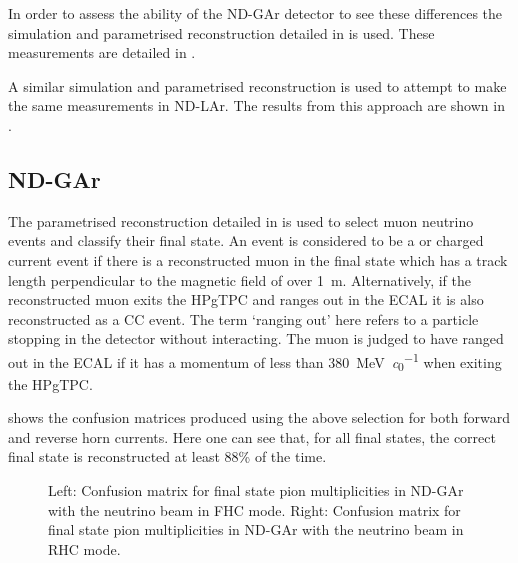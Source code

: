 In order to assess the ability of the ND-GAr detector to see these differences the simulation and parametrised reconstruction detailed in  is used.
These measurements are detailed in .

A similar simulation and parametrised reconstruction is used to attempt to make the same measurements in ND-LAr. 
The results from this approach are shown in .

\subsection{ND-GAr}
\label{sec:dune_ndrwt:pionMulti:gar}

The parametrised reconstruction detailed in  is used to select muon neutrino events and classify their final state.
An event is considered to be a \numu or \anumu charged current event if there is a reconstructed muon in the final state which has a track length perpendicular to the magnetic field of over \SI{1}{\metre}.
Alternatively, if the reconstructed muon exits the HPgTPC and ranges out in the ECAL it is also reconstructed as a \numu CC event.
The term `ranging out' here refers to a particle stopping in the detector without interacting.
The muon is judged to have ranged out in the ECAL if it has a momentum of less than \SI{380}{\MeV\per\clight} when exiting the HPgTPC. 

 shows the confusion matrices produced using the above selection for both forward and reverse horn currents. 
Here one can see that, for all final states, the correct final state is reconstructed at least 88\% of the time.

\begin{figure}[h]
	\begin{minipage}[t]{.5\linewidth}
		\begin{adjustbox}{max totalsize=\linewidth, center}
			
		\end{adjustbox}
	\end{minipage}
	\hfill
	\begin{minipage}[t]{.5\linewidth}
		\begin{adjustbox}{max totalsize=\linewidth, center}
			
		\end{adjustbox}
	\end{minipage}
	\caption[Confusion matrices for final state pion multiplicities in ND-GAr]{Left: Confusion matrix for final state pion multiplicities in ND-GAr with the neutrino beam in FHC mode. Right: Confusion matrix for final state pion multiplicities in ND-GAr with the neutrino beam in RHC mode.}
	\label{fig:confusMatPi}
\end{figure}

